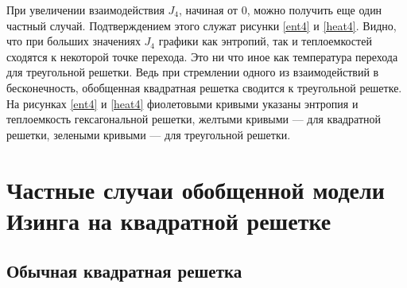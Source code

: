 

При увеличении взаимодействия $J_4$, начиная от $0$, можно получить еще один частный случай. Подтверждением этого служат рисунки \ref{ent4} и \ref{heat4}. Видно, что при больших значениях $J_4$ графики как энтропий, так и теплоемкостей сходятся к некоторой точке перехода. Это ни что иное как температура перехода для треугольной решетки. Ведь при стремлении одного из взаимодействий в бесконечность, обобщенная квадратная решетка сводится к треугольной решетке. На рисунках \ref{ent4} и \ref{heat4} фиолетовыми кривыми указаны энтропия и теплоемкость гексагональной решетки, желтыми кривыми --- для квадратной решетки, зелеными кривыми --- для треугольной решетки.

\section{Частные случаи обобщенной модели Изинга на квадратной решетке}

\subsection{Обычная квадратная решетка}
 
